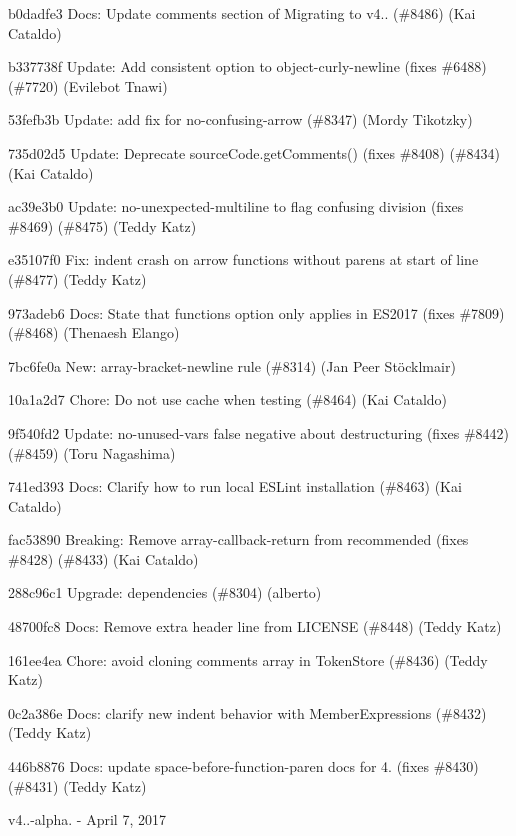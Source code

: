 \begin{DoxyItemize}
\item b0dadfe3 Docs\+: Update comments section of Migrating to v4.. (\#8486) (Kai Cataldo)
\item b337738f Update\+: Add {\ttfamily consistent} option to {\ttfamily object-\/curly-\/newline} (fixes \#6488) (\#7720) (Evilebot Tnawi)
\item 53fefb3b Update\+: add fix for no-\/confusing-\/arrow (\#8347) (Mordy Tikotzky)
\item 735d02d5 Update\+: Deprecate source\+Code.\+get\+Comments() (fixes \#8408) (\#8434) (Kai Cataldo)
\item ac39e3b0 Update\+: no-\/unexpected-\/multiline to flag confusing division (fixes \#8469) (\#8475) (Teddy Katz)
\item e35107f0 Fix\+: indent crash on arrow functions without parens at start of line (\#8477) (Teddy Katz)
\item 973adeb6 Docs\+: State that functions option only applies in ES2017 (fixes \#7809) (\#8468) (Thenaesh Elango)
\item 7bc6fe0a New\+: array-\/bracket-\/newline rule (\#8314) (Jan Peer Stöcklmair)
\item 10a1a2d7 Chore\+: Do not use cache when testing (\#8464) (Kai Cataldo)
\item 9f540fd2 Update\+: no-\/unused-\/vars false negative about destructuring (fixes \#8442) (\#8459) (Toru Nagashima)
\item 741ed393 Docs\+: Clarify how to run local ESLint installation (\#8463) (Kai Cataldo)
\item fac53890 Breaking\+: Remove array-\/callback-\/return from recommended (fixes \#8428) (\#8433) (Kai Cataldo)
\item 288c96c1 Upgrade\+: dependencies (\#8304) (alberto)
\item 48700fc8 Docs\+: Remove extra header line from LICENSE (\#8448) (Teddy Katz)
\item 161ee4ea Chore\+: avoid cloning comments array in Token\+Store (\#8436) (Teddy Katz)
\item 0c2a386e Docs\+: clarify new indent behavior with Member\+Expressions (\#8432) (Teddy Katz)
\item 446b8876 Docs\+: update space-\/before-\/function-\/paren docs for 4. (fixes \#8430) (\#8431) (Teddy Katz)
\end{DoxyItemize}

v4..-\/alpha. -\/ April 7, 2017


